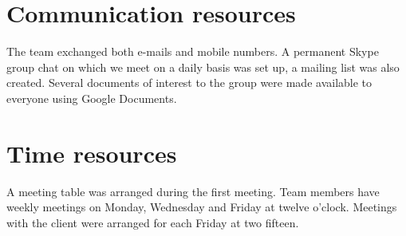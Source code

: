 
\section{Communication resources}

The team exchanged both e-mails and mobile numbers. A permanent Skype
group chat on which we meet on a daily basis was set up, a mailing
list was also created. Several documents of interest to the group
were made available to everyone using Google Documents.


\section{Time resources}

A meeting table was arranged during the first meeting. Team members
have weekly meetings on Monday, Wednesday and Friday at twelve o'clock.
Meetings with the client were arranged for each Friday at two fifteen.
